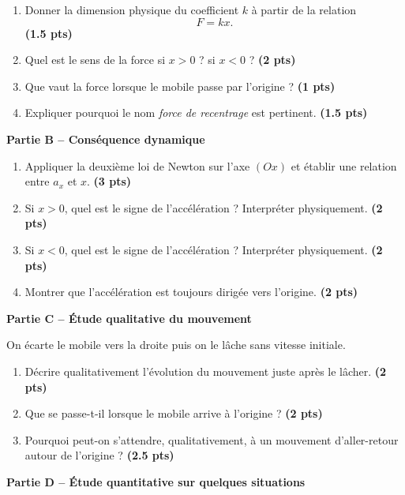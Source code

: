 \documentclass[11pt,a4paper]{article}
\newcommand{\bareme}[1]{\hfill{\color{blue!70!black}\textbf{(#1 pts)}}}
\begin{document}
\begin{enumerate}[label=\textbf{A.\arabic*.}, leftmargin=0.9cm]
    \item Donner la dimension physique du coefficient $k$ à partir de la relation
    \[
    F=kx.
    \]
    \bareme{1.5}
    \item Quel est le sens de la force si $x>0$ ? si $x<0$ ? \bareme{2}
    \item Que vaut la force lorsque le mobile passe par l’origine ? \bareme{1}
    \item Expliquer pourquoi le nom \emph{force de recentrage} est pertinent. \bareme{1.5}
\end{enumerate}

\medskip

\textbf{Partie B -- Conséquence dynamique}

\begin{enumerate}[label=\textbf{B.\arabic*.}, leftmargin=0.9cm]
    \item Appliquer la deuxième loi de Newton sur l’axe $(Ox)$ et établir une relation entre $a_x$ et $x$. \bareme{3}
    \item Si $x>0$, quel est le signe de l’accélération ? Interpréter physiquement. \bareme{2}
    \item Si $x<0$, quel est le signe de l’accélération ? Interpréter physiquement. \bareme{2}
    \item Montrer que l’accélération est toujours dirigée vers l’origine. \bareme{2}
\end{enumerate}

\medskip

\textbf{Partie C -- Étude qualitative du mouvement}

On écarte le mobile vers la droite puis on le lâche sans vitesse initiale.

\begin{enumerate}[label=\textbf{C.\arabic*.}, leftmargin=0.9cm]
    \item Décrire qualitativement l’évolution du mouvement juste après le lâcher. \bareme{2}
    \item Que se passe-t-il lorsque le mobile arrive à l’origine ? \bareme{2}
    \item Pourquoi peut-on s’attendre, qualitativement, à un mouvement d’aller-retour autour de l’origine ? \bareme{2.5}
\end{enumerate}

\medskip

\textbf{Partie D -- Étude quantitative sur quelques situations}
\end{document}
